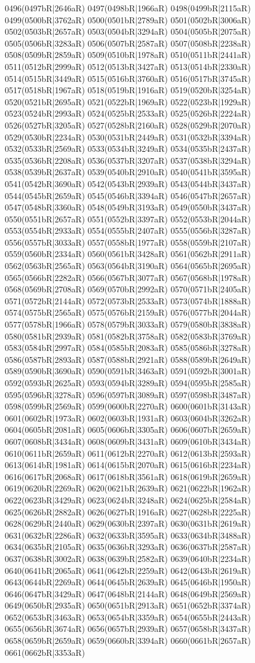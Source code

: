 0496(0497bR|2646aR) 0497(0498bR|1966aR) 0498(0499bR|2115aR) 0499(0500bR|3762aR) 0500(0501bR|2789aR) 0501(0502bR|3006aR) 0502(0503bR|2657aR) 0503(0504bR|3294aR) 0504(0505bR|2075aR) 0505(0506bR|3283aR) 0506(0507bR|2587aR) 0507(0508bR|2238aR) 0508(0509bR|2859aR) 0509(0510bR|1978aR) 0510(0511bR|2441aR) 0511(0512bR|2999aR) 0512(0513bR|3427aR) 0513(0514bR|2330aR) 0514(0515bR|3449aR) 0515(0516bR|3760aR) 0516(0517bR|3745aR) 0517(0518bR|1967aR) 0518(0519bR|1916aR) 0519(0520bR|3254aR) 0520(0521bR|2695aR) 0521(0522bR|1969aR) 0522(0523bR|1929aR) 0523(0524bR|2993aR) 0524(0525bR|2533aR) 0525(0526bR|2224aR) 0526(0527bR|3205aR) 0527(0528bR|2160aR) 0528(0529bR|2070aR) 0529(0530bR|2234aR) 0530(0531bR|2449aR) 0531(0532bR|3394aR) 0532(0533bR|2569aR) 0533(0534bR|3249aR) 0534(0535bR|2437aR) 0535(0536bR|2208aR) 0536(0537bR|3207aR) 0537(0538bR|3294aR) 0538(0539bR|2637aR) 0539(0540bR|2910aR) 0540(0541bR|3595aR) 0541(0542bR|3690aR) 0542(0543bR|2939aR) 0543(0544bR|3437aR) 0544(0545bR|2659aR) 0545(0546bR|3394aR) 0546(0547bR|2657aR) 0547(0548bR|3360aR) 0548(0549bR|3193aR) 0549(0550bR|3437aR) 0550(0551bR|2657aR) 0551(0552bR|3397aR) 0552(0553bR|2044aR) 0553(0554bR|2933aR) 0554(0555bR|2407aR) 0555(0556bR|3287aR) 0556(0557bR|3033aR) 0557(0558bR|1977aR) 0558(0559bR|2107aR) 0559(0560bR|2334aR) 0560(0561bR|3428aR) 0561(0562bR|2911aR) 0562(0563bR|2565aR) 0563(0564bR|3190aR) 0564(0565bR|2695aR) 0565(0566bR|2282aR) 0566(0567bR|3077aR) 0567(0568bR|1978aR) 0568(0569bR|2708aR) 0569(0570bR|2992aR) 0570(0571bR|2405aR) 0571(0572bR|2144aR) 0572(0573bR|2533aR) 0573(0574bR|1888aR) 0574(0575bR|2565aR) 0575(0576bR|2159aR) 0576(0577bR|2044aR) 0577(0578bR|1966aR) 0578(0579bR|3033aR) 0579(0580bR|3838aR) 0580(0581bR|2939aR) 0581(0582bR|3758aR) 0582(0583bR|3769aR) 0583(0584bR|2997aR) 0584(0585bR|2083aR) 0585(0586bR|3278aR) 0586(0587bR|2893aR) 0587(0588bR|2921aR) 0588(0589bR|2649aR) 0589(0590bR|3690aR) 0590(0591bR|3463aR) 0591(0592bR|3001aR) 0592(0593bR|2625aR) 0593(0594bR|3289aR) 0594(0595bR|2585aR) 0595(0596bR|3278aR) 0596(0597bR|3089aR) 0597(0598bR|3487aR) 0598(0599bR|2569aR) 0599(0600bR|2270aR) 0600(0601bR|3143aR) 0601(0602bR|1973aR) 0602(0603bR|1931aR) 0603(0604bR|3262aR) 0604(0605bR|2081aR) 0605(0606bR|3305aR) 0606(0607bR|2659aR) 0607(0608bR|3434aR) 0608(0609bR|3431aR) 0609(0610bR|3434aR) 0610(0611bR|2659aR) 0611(0612bR|2270aR) 0612(0613bR|2593aR) 0613(0614bR|1981aR) 0614(0615bR|2070aR) 0615(0616bR|2234aR) 0616(0617bR|2068aR) 0617(0618bR|3561aR) 0618(0619bR|2659aR) 0619(0620bR|2269aR) 0620(0621bR|2639aR) 0621(0622bR|1962aR) 0622(0623bR|3429aR) 0623(0624bR|3248aR) 0624(0625bR|2584aR) 0625(0626bR|2882aR) 0626(0627bR|1916aR) 0627(0628bR|2225aR) 0628(0629bR|2440aR) 0629(0630bR|2397aR) 0630(0631bR|2619aR) 0631(0632bR|2286aR) 0632(0633bR|3595aR) 0633(0634bR|3488aR) 0634(0635bR|2105aR) 0635(0636bR|3293aR) 0636(0637bR|2587aR) 0637(0638bR|3002aR) 0638(0639bR|2582aR) 0639(0640bR|2234aR) 0640(0641bR|2065aR) 0641(0642bR|2259aR) 0642(0643bR|2619aR) 0643(0644bR|2269aR) 0644(0645bR|2639aR) 0645(0646bR|1950aR) 0646(0647bR|3429aR) 0647(0648bR|2144aR) 0648(0649bR|2569aR) 0649(0650bR|2935aR) 0650(0651bR|2913aR) 0651(0652bR|3374aR) 0652(0653bR|3463aR) 0653(0654bR|3359aR) 0654(0655bR|2443aR) 0655(0656bR|3674aR) 0656(0657bR|2939aR) 0657(0658bR|3437aR) 0658(0659bR|2659aR) 0659(0660bR|3394aR) 0660(0661bR|2657aR) 0661(0662bR|3353aR) 